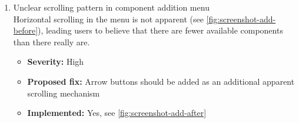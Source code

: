 \begin{enumerate}[label=\textbf{I\arabic*:}, leftmargin=27pt]
    \item Unclear scrolling pattern in component addition menu
        \vspace{2pt}
        \\Horizontal scrolling in the menu is not apparent (see \autoref{fig:screenshot-add-before}), leading users to believe that there are fewer available components than there really are.
        \begin{itemize}[noitemsep, label=\trianglebullet]
            \item \textbf{Severity:} High
            \item \textbf{Proposed fix:} Arrow buttons should be added as an additional apparent scrolling mechanism
            \item \textbf{Implemented:} Yes, see \autoref{fig:screenshot-add-after}
        \end{itemize}
        \vspace{2em}


\end{enumerate}
